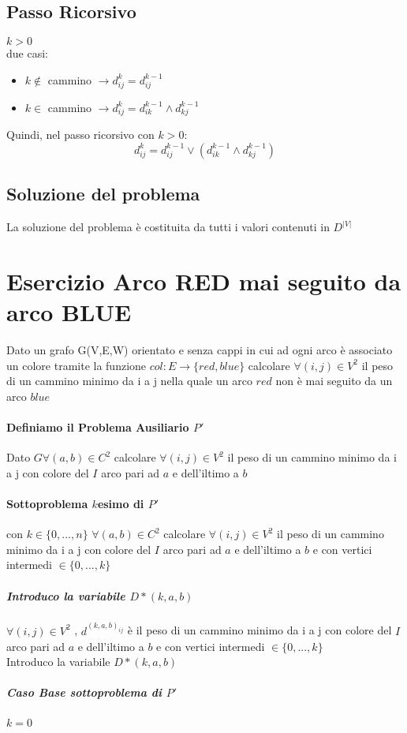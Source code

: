 \documentclass[12pt, a4paper, openany]{book}
\begin{document}
	\subsection*{Passo Ricorsivo} $k>0$\\
	due casi:
	\begin{itemize}
		\item $k\notin$ cammino $\rightarrow d^k_{ij} = d^{k-1}_{ij}$
		\item $k \in$ cammino $\rightarrow d^k_{ij} = d^{k-1}_{ik} \land d^{k-1}_{kj}$
	\end{itemize}
	Quindi, nel passo ricorsivo con $k>0$:
	\begin{equation*}
		d^k_{ij} = d^{k-1}_{ij} \lor  (d^{k-1}_{ik} \land d^{k-1}_{kj})
	\end{equation*}

	\subsection*{Soluzione del problema}
	La soluzione del problema è costituita da tutti i valori contenuti in $D^{|V|}$

	\section{Esercizio Arco RED mai seguito da arco BLUE}
	Dato un grafo G(V,E,W) orientato e senza cappi in cui ad ogni arco è associato un colore tramite la funzione $col: E\rightarrow \{red,blue\}$
	calcolare $\forall (i,j) \in V^2$ il peso di un cammino minimo da i a j nella quale un arco $red$ non è mai seguito da un arco $blue$

	\paragraph{Definiamo il Problema Ausiliario $P'$}
	Dato $G \forall(a,b) \in C^2$ calcolare $\forall(i,j) \in V^2$ il peso di un cammino minimo da i a j con
	colore del $I$ arco pari ad $a$ e dell'iltimo a $b$

	\paragraph{Sottoproblema $k$esimo di $P'$} con $k \in \{0,...,n\}$
$\forall(a,b) \in C^2$ calcolare $\forall(i,j) \in V^2$ il peso di un cammino minimo da i a j con
	colore del $I$ arco pari ad $a$ e dell'iltimo a $b$ e con vertici intermedi $\in \{0,...,k\}$\\
	\subparagraph{Introduco la variabile $D*{(k,a,b)}$}
$\forall(i,j)\in V^2$ , $d^{(k,a,b)_{ij}}$ è il peso di un cammino minimo da i a j  con
	colore del $I$ arco pari ad $a$ e dell'iltimo a $b$ e con vertici intermedi $\in \{0,...,k\}$\\
	Introduco la variabile $D*{(k,a,b)}$
	\subparagraph{Caso Base sottoproblema di $P'$} $k = 0$
\end{document}

